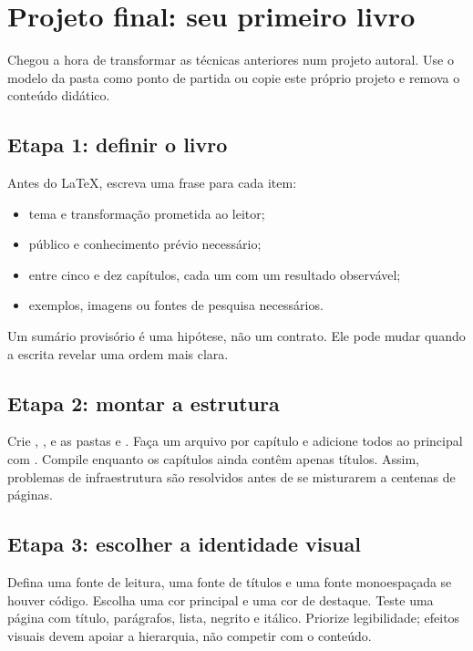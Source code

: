 \chapter{Projeto final: seu primeiro livro}
\label{chap:projeto-final}

Chegou a hora de transformar as técnicas anteriores num projeto autoral. Use o
modelo da pasta  como ponto de partida ou copie este próprio
projeto e remova o conteúdo didático.

\section{Etapa 1: definir o livro}

Antes do LaTeX, escreva uma frase para cada item:

\begin{itemize}
  \item tema e transformação prometida ao leitor;
  \item público e conhecimento prévio necessário;
  \item entre cinco e dez capítulos, cada um com um resultado observável;
  \item exemplos, imagens ou fontes de pesquisa necessários.
\end{itemize}

Um sumário provisório é uma hipótese, não um contrato. Ele pode mudar quando a
escrita revelar uma ordem mais clara.

\section{Etapa 2: montar a estrutura}

Crie , ,  e as
pastas  e . Faça um arquivo por capítulo e
adicione todos ao principal com . Compile enquanto os capítulos
ainda contêm apenas títulos. Assim, problemas de infraestrutura são resolvidos
antes de se misturarem a centenas de páginas.

\section{Etapa 3: escolher a identidade visual}

Defina uma fonte de leitura, uma fonte de títulos e uma fonte monoespaçada se
houver código. Escolha uma cor principal e uma cor de destaque. Teste uma página
com título, parágrafos, lista, negrito e itálico. Priorize legibilidade; efeitos
visuais devem apoiar a hierarquia, não competir com o conteúdo.

